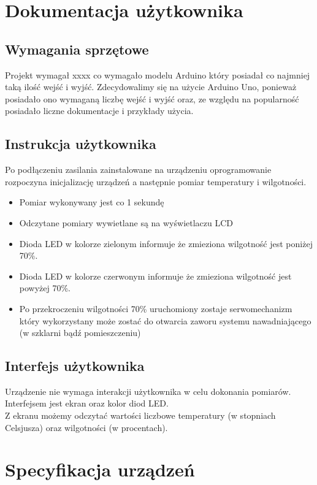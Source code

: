 \documentclass{classrep}
\begin{document}
\section {Dokumentacja użytkownika}
\subsection {Wymagania sprzętowe}
Projekt wymagał xxxx co wymagało modelu Arduino który posiadał co najmniej taką ilość wejść i wyjść. Zdecydowalimy się na użycie Arduino Uno, ponieważ posiadało ono wymaganą liczbę wejść i wyjść oraz, ze względu na popularność posiadało liczne dokumentacje i przykłady użycia.

\subsection {Instrukcja użytkownika}
Po podłączeniu zasilania zainstalowane na urządzeniu oprogramowanie rozpoczyna inicjalizację urządzeń a następnie pomiar temperatury i wilgotności.

\begin{itemize}
  \item Pomiar wykonywany jest co 1 sekundę 
  \item Odczytane pomiary wywietlane są na wyświetlaczu LCD
  \item Dioda LED w kolorze zielonym informuje że zmieziona wilgotność jest poniżej 70\%.
  \item Dioda LED w kolorze czerwonym informuje że zmieziona wilgotność jest powyżej 70\%.
  \item Po przekroczeniu wilgotności 70\% uruchomiony zostaje serwomechanizm który wykorzystany może zostać do otwarcia zaworu systemu nawadniającego (w szklarni bądź pomieszczeniu)
\end{itemize}

\subsection {Interfejs użytkownika}
Urządzenie nie wymaga interakcji użytkownika w celu dokonania pomiarów. Interfejsem jest ekran oraz kolor diod LED.\\

Z ekranu możemy odczytać wartości liczbowe temperatury (w stopniach Celsjusza) oraz wilgotności (w procentach).

\section {Specyfikacja urządzeń}
\end{document}
